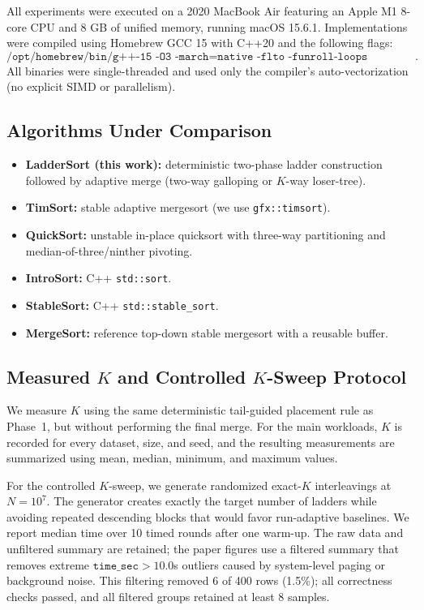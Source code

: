 \documentclass[10pt]{article}
\begin{document}
All experiments were executed on a 2020 MacBook Air featuring an Apple M1 8-core CPU and 8 GB of unified memory, running macOS 15.6.1. Implementations were compiled using Homebrew GCC 15 with C++20 and the following flags:
\[
\texttt{/opt/homebrew/bin/g++-15 -O3 -march=native -flto -funroll-loops -std=c++20}.
\]
All binaries were single-threaded and used only the compiler’s auto-vectorization (no explicit SIMD or parallelism).

\subsection{Algorithms Under Comparison}\label{algorithms-under-comparison}

\begin{itemize}
\item \textbf{LadderSort (this work):} deterministic two-phase ladder construction followed by adaptive merge (two-way galloping or \(K\)-way loser-tree).
\item \textbf{TimSort:} stable adaptive mergesort (we use \texttt{gfx::timsort}).
\item \textbf{QuickSort:} unstable in-place quicksort with three-way partitioning and median-of-three/ninther pivoting.
\item \textbf{IntroSort:} C++ \texttt{std::sort}.
\item \textbf{StableSort:} C++ \texttt{std::stable\_sort}.
\item \textbf{MergeSort:} reference top-down stable mergesort with a reusable buffer.
\end{itemize}

\subsection{Measured \(K\) and Controlled \(K\)-Sweep Protocol}
\label{k-measurement-protocol}

We measure \(K\) using the same deterministic tail-guided placement rule as Phase~1, but without performing the final merge. For the main workloads, \(K\) is recorded for every dataset, size, and seed, and the resulting measurements are summarized using mean, median, minimum, and maximum values.

For the controlled \(K\)-sweep, we generate randomized exact-\(K\) interleavings at \(N=10^7\). The generator creates exactly the target number of ladders while avoiding repeated descending blocks that would favor run-adaptive baselines. We report median time over 10 timed rounds after one warm-up. The raw data and unfiltered summary are retained; the paper figures use a filtered summary that removes extreme \(\texttt{time\_sec} > 10.0\)s outliers caused by system-level paging or background noise. This filtering removed 6 of 400 rows (1.5\%); all correctness checks passed, and all filtered groups retained at least 8 samples.
\end{document}
